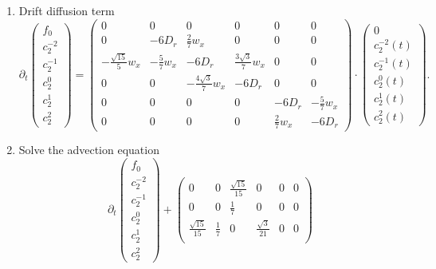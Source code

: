 \begin{frame}
	\scriptsize
	\begin{enumerate}
		\item Drift diffusion term
		\begin{equation*}
			\partial_t \left(\begin{array}{c}
				f_0 \\
				c_2^{-2} \\
				c_2^{-1} \\
				c_2^0 \\
				c_2^1 \\
				c_2^2
			\end{array}\right)  = \begin{pmatrix}
				0 & 0 & 0 & 0 & 0 & 0 \\
				0 & -6D_r & \frac{2}{7}w_x & 0 & 0 & 0 \\
				-\frac{\sqrt{15}}{5}w_x & -\frac{5}{7}w_x & -6D_r & \frac{3\sqrt{3}}{7}w_x & 0 & 0 \\
				0 & 0 & -\frac{4\sqrt{3}}{7}w_x & -6D_r & 0 & 0 \\
				0 & 0 & 0 & 0 & -6D_r & -\frac{5}{7} w_x\\
				0 & 0 & 0 & 0 & \frac{2}{7}w_x & -6D_r
			\end{pmatrix} \cdot
			\left(\begin{array}{c}
				0 \\
				c^{-2}_2(t) \\
				c_2^{-1}(t) \\
				c_2^0(t) \\
				c_2^1(t) \\
				c_2^2(t)
			\end{array}\right).
		\end{equation*}
	\item Solve the advection equation
		$$
	\partial_t \left(\begin{array}{c}
		f_0 \\
		c_2^{-2} \\
		c_2^{-1} \\
		c_2^0 \\
		c_2^1 \\
		c_2^2
	\end{array}\right) + \begin{pmatrix}
		0 & 0 & \frac{\sqrt{15}}{15} & 0 & 0 & 0 \\
		0 & 0 & \frac{1}{7} & 0 & 0 & 0 \\
		\frac{\sqrt{15}}{15} & \frac{1}{7} & 0 & \frac{\sqrt{3}}{21} & 0 &  0 \\

\end{pmatrix}$$
\end{enumerate}
\end{frame}
